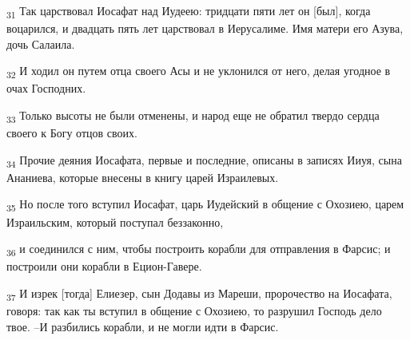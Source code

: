 \begin{tcolorbox}
\textsubscript{31} Так царствовал Иосафат над Иудеею: тридцати пяти лет он [был], когда воцарился, и двадцать пять лет царствовал в Иерусалиме. Имя матери его Азува, дочь Салаила.
\end{tcolorbox}
\begin{tcolorbox}
\textsubscript{32} И ходил он путем отца своего Асы и не уклонился от него, делая угодное в очах Господних.
\end{tcolorbox}
\begin{tcolorbox}
\textsubscript{33} Только высоты не были отменены, и народ еще не обратил твердо сердца своего к Богу отцов своих.
\end{tcolorbox}
\begin{tcolorbox}
\textsubscript{34} Прочие деяния Иосафата, первые и последние, описаны в записях Ииуя, сына Ананиева, которые внесены в книгу царей Израилевых.
\end{tcolorbox}
\begin{tcolorbox}
\textsubscript{35} Но после того вступил Иосафат, царь Иудейский в общение с Охозиею, царем Израильским, который поступал беззаконно,
\end{tcolorbox}
\begin{tcolorbox}
\textsubscript{36} и соединился с ним, чтобы построить корабли для отправления в Фарсис; и построили они корабли в Ецион-Гавере.
\end{tcolorbox}
\begin{tcolorbox}
\textsubscript{37} И изрек [тогда] Елиезер, сын Додавы из Мареши, пророчество на Иосафата, говоря: так как ты вступил в общение с Охозиею, то разрушил Господь дело твое. --И разбились корабли, и не могли идти в Фарсис.
\end{tcolorbox}
